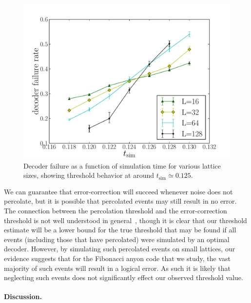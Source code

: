 \documentclass[aps, prl, letterpaper, twocolumn, superscriptaddress, notitlepage, 10pt]{revtex4-1}
\newcommand{\cggb}[1]{\textcolor{blue}{#1}}
\begin{document}
\begin{figure}[th!]
\begin{center}
	\includegraphics[width=\columnwidth]{anyons-kyle.pdf}
\caption{Decoder failure as a function of simulation time for various lattice sizes, showing 
threshold behavior at around $t_{\mathrm{sim}}\simeq 0.125$.}
\label{f:threshold}
\end{center}
\end{figure}


We can guarantee that error-correction will succeed whenever noise does not percolate, but it is possible that percolated events may still result in no error. The connection between the percolation threshold and the error-correction threshold is not well understood in general~\cite{Hastings2014}, though it is clear that our threshold estimate will be a lower bound for the true threshold that may be found if all events (including those that have percolated) were simulated by an optimal decoder. However, by simulating such percolated events on small lattices, our evidence suggests that for the Fibonacci anyon code that we study, the vast majority of such events will result in a logical error. As such it is likely that neglecting such events does not significantly effect our observed threshold value.


\paragraph{Discussion.}
\end{document}
